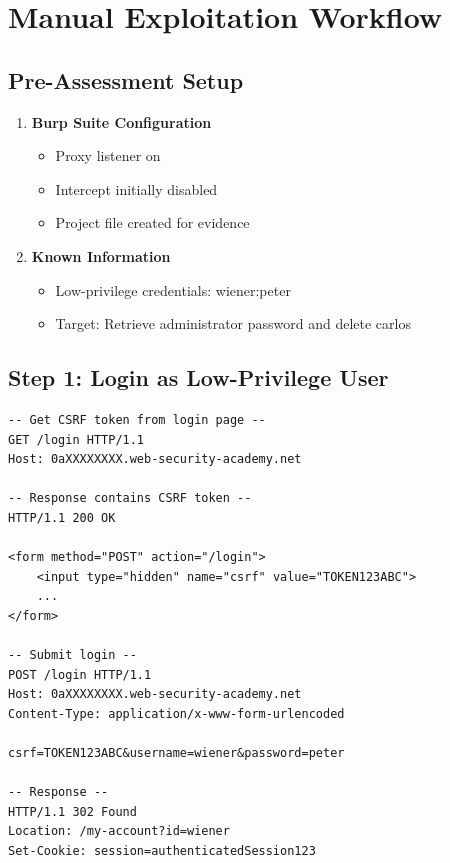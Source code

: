 \documentclass[11pt,letterpaper]{article}
\newcommand{\inlinecode}[1]{\texttt{\detokenize{#1}}}
\begin{document}
\section{Manual Exploitation Workflow}

\subsection{Pre-Assessment Setup}

\begin{enumerate}
  \item \textbf{Burp Suite Configuration}
  \begin{itemize}
    \item Proxy listener on \inlinecode{127.0.0.1:8080}
    \item Intercept initially disabled
    \item Project file created for evidence
  \end{itemize}

  \item \textbf{Known Information}
  \begin{itemize}
    \item Low-privilege credentials: wiener:peter
    \item Target: Retrieve administrator password and delete carlos
  \end{itemize}
\end{enumerate}

\subsection{Step 1: Login as Low-Privilege User}

\begin{listing}[H]
\begin{verbatim}
-- Get CSRF token from login page --
GET /login HTTP/1.1
Host: 0aXXXXXXXX.web-security-academy.net

-- Response contains CSRF token --
HTTP/1.1 200 OK

<form method="POST" action="/login">
    <input type="hidden" name="csrf" value="TOKEN123ABC">
    ...
</form>

-- Submit login --
POST /login HTTP/1.1
Host: 0aXXXXXXXX.web-security-academy.net
Content-Type: application/x-www-form-urlencoded

csrf=TOKEN123ABC&username=wiener&password=peter

-- Response --
HTTP/1.1 302 Found
Location: /my-account?id=wiener
Set-Cookie: session=authenticatedSession123
\end{verbatim}
\caption{Step 1: Login with provided credentials}
\end{listing}
\end{document}
